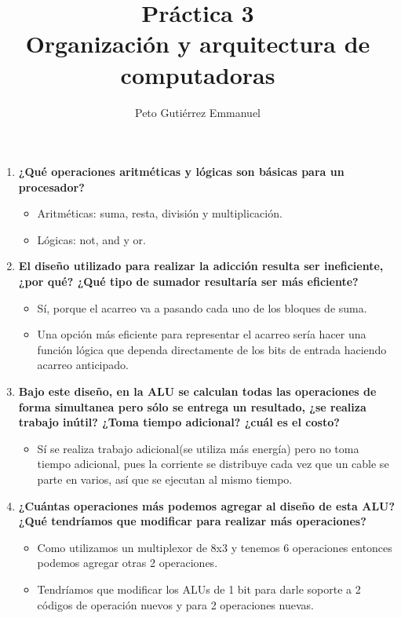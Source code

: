 \documentclass{article}
\title{Práctica 3 \\ Organización y arquitectura de computadoras}
\author{Peto Gutiérrez Emmanuel}
\begin{document}
\maketitle

\begin{enumerate}[1.]
\item \textbf{¿Qué operaciones aritméticas y lógicas son básicas para un procesador?}
	\begin{itemize}
	\item Aritméticas: suma, resta, división y multiplicación.
	\item Lógicas: not, and y or.
	\end{itemize}
\item \textbf{El diseño utilizado para realizar la adicción resulta ser ineficiente, ¿por qué? ¿Qué tipo de sumador resultaría ser más eficiente?}
	\begin{itemize}
	\item Sí, porque el acarreo va a pasando cada uno de los bloques de suma.
	\item Una opción más eficiente para representar el acarreo sería hacer una función lógica que dependa
directamente de los bits de entrada haciendo acarreo anticipado.
	\end{itemize}
\item \textbf{Bajo este diseño, en la ALU se calculan todas las operaciones de forma simultanea pero sólo se entrega un resultado, ¿se realiza trabajo inútil? ¿Toma tiempo adicional? ¿cuál es el costo?}
	\begin{itemize}
	\item Sí se realiza trabajo adicional(se utiliza más energía) pero no toma tiempo adicional, pues la corriente se distribuye cada vez que un cable se parte en varios, así que se ejecutan al mismo tiempo.
	\end{itemize}
\item \textbf{¿Cuántas operaciones más podemos agregar al diseño de esta ALU? ¿Qué tendríamos que
modificar para realizar más operaciones?}
	\begin{itemize}
	\item Como utilizamos un multiplexor de 8x3 y tenemos 6 operaciones entonces podemos agregar otras 2
operaciones.
	\item Tendríamos que modificar los ALUs de 1 bit para darle soporte a 2 códigos de operación nuevos y para 2 operaciones nuevas.
	\end{itemize}
\end{enumerate}
\end{document}
